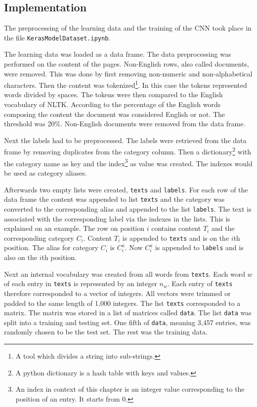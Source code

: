 \subsection{Implementation} \label{ClassificationImplementation}
The preprocessing of the learning data and the training of the CNN took place in the file \texttt{KerasModelDataset.ipynb}. 

The learning data was loaded as a data frame. The data preprocessing was performed on the content of the pages. Non-English rows, also called documents, were removed. This was done by first removing non-numeric and non-alphabetical characters. Then the content was tokenized\footnote{A tool which divides a string into sub-strings.}. In this case the tokens represented words divided by spaces. The tokens were then compared to the English vocabulary of NLTK. According to the percentage of the English words composing the content the document was considered English or not. The threshold was 20\%. Non-English documents were removed from the data frame.

Next the labels had to be preprocessed. The labels were retrieved from the data frame by removing duplicates from the category column. Then a dictionary\footnote{A python dictionary is a hash table with keys and values.} with the category name as key and the index\footnote{An index in context of this chapter is an integer value corresponding to the position of an entry. It starts from 0.} as value was created. The indexes would be used as category aliases. 

Afterwards two empty lists were created, \texttt{texts} and \texttt{labels}. For each row of the data frame the content was appended to list \texttt{texts} and the category was converted to the corresponding alias and appended to the list \texttt{labels}. The text is associated with the corresponding label via the indexes in the lists.  This is explained on an example. The row on position $i$ contains content $T_i$ and the corresponding category $C_i$. Content $T_i$ is appended to \texttt{texts} and is on the $i$th position. The alias for category $C_i$ is $C^a_i$. Now $C^a_i$ is appended to \texttt{labels} and is also on the $i$th position.

Next an internal vocabulary was created from all words from \texttt{texts}. Each word $w$ of each entry in \texttt{texts} is represented by an integer $n_w$. Each entry of \texttt{texts} therefore corresponded to a vector of integers. All vectors were trimmed or padded to the same length of 1,000 integers. The list \texttt{texts} corresponded to a matrix. The matrix was stored in a list of matrices called \texttt{data}. The list \texttt{data} was split into a training and testing set. One fifth of \texttt{data}, meaning 3,457 entries, was randomly chosen to be the test set. The rest was the training data.

